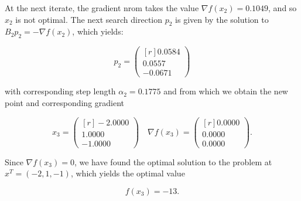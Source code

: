 \begin{solution}
    At the next iterate, the gradient nrom takes the value $\nabla f(x_2) = 0.1049$, and so $x_2$ is not optimal. The
    next search direction $p_2$ is given by the solution to $B_2 p_2 = -\nabla f(x_2)$, which yields:

    $$
    p_2 = \begin{pmatrix*}[r]
         0.0584 \\
         0.0557 \\
        -0.0671
    \end{pmatrix*}
    $$

    with corresponding step length $\alpha_2 = 0.1775$ and from which we obtain the new point and corresponding gradient

    $$
    x_3 = \begin{pmatrix*}[r]
        -2.0000 \\
         1.0000 \\
        -1.0000
    \end{pmatrix*} \quad \nabla f(x_3) = \begin{pmatrix*}[r]
        0.0000 \\
        0.0000 \\
        0.0000
    \end{pmatrix*}.
    $$

    Since $\nabla f(x_3) = 0$, we have found the optimal solution to the problem at \linebreak
    $x^T = (-2, 1, -1)$, which yields the optimal value

    $$
    f(x_3) = -13.
    $$
    \ \\
\end{solution}
